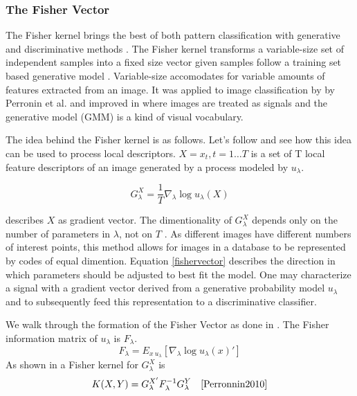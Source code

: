 \documentclass[english,12pt,a4paper,pdftex,elec,utf8]{aaltothesis}
\begin{document}
\subsubsection{The Fisher Vector}\label{FV}
The Fisher kernel brings the best of both pattern classification with generative and discriminative methods \cite{Jaakkola1999}. The Fisher kernel transforms a variable-size set of independent samples into a fixed size vector given samples follow a training set based generative model \cite{Jaakkola1999}. Variable-size accomodates for variable amounts of features extracted from an image. It was applied to image classification by by Perronin et al. \cite{Perronnin2007} and improved in \cite{Perronnin2010} where images are treated as signals and the generative model (GMM) is a kind of visual vocabulary.

The idea behind the Fisher kernel is as follows. Let's follow \cite{Perronnin2010} and see how this idea can be used to process local descriptors. $X = {x_t, t = 1 \ldots T}$ is a set of T local feature descriptors of an image generated by a process modeled by $u_\lambda$.

\begin{equation}\label{fishervector}
 G_\lambda^X = \frac{1}{T}\nabla_\lambda\log u_\lambda(X)
\end{equation}

describes $X$ as gradient vector. The dimentionality of $G_\lambda^X$ depends only on the number of parameters in $\lambda$, not on $T$ \cite{Perronnin2010}. As different images have different numbers of interest points, this method allows for images in a database to be represented by codes of equal dimention. Equation \ref{fishervector} describes the direction in which parameters should be adjusted to best fit the model. One may characterize a signal with a gradient vector derived from a generative probability model $u_\lambda$ and to subsequently feed this representation to a discriminative classifier. \cite{Perronnin2007}


We walk through the formation of the Fisher Vector as done in \cite{Perronnin2010}. The Fisher information matrix of $u_\lambda$ is $F_\lambda$.
\begin{equation}\label{fishermatrix}
F_\lambda = E_{x~u_\lambda}[\nabla_\lambda\log u_\lambda(x)']
\end{equation}
As shown in \cite{Jaakkola1999} a Fisher kernel for $G_\lambda^X$ is
\begin{equation}\label{fisherkernel}
K(X,Y) = G_\lambda^{X'}F_\lambda^{-1}G_\lambda^Y \quad \cite{Perronnin2010}
\end{equation}
\end{document}
